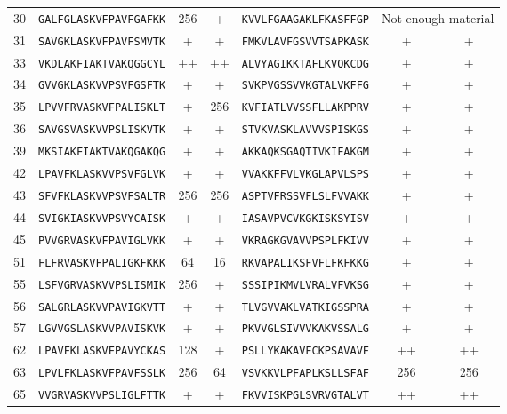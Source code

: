 \begin{table}[ptbh]
\begin{tabular}{llcclcc}
30  &  \texttt{GALFGLASKVFPAVFGAFKK}  &  256  &  +  & \texttt{KVVLFGAAGAKLFKASFFGP}  &  \multicolumn{2}{c}{Not enough material}   \\
\rowcolor[gray]{0.9}
31  &  \texttt{SAVGKLASKVFPAVFSMVTK}  &  +  &  +  & \texttt{FMKVLAVFGSVVTSAPKASK}  &  +  &  + \\
33  &  \texttt{VKDLAKFIAKTVAKQGGCYL}  &  ++  &  ++  & \texttt{ALVYAGIKKTAFLKVQKCDG}  &  +  &  + \\
\rowcolor[gray]{0.9}
34  &  \texttt{GVVGKLASKVVPSVFGSFTK}  &  +  &  +  & \texttt{SVKPVGSSVVKGTALVKFFG}  &  +  &  + \\
35  &  \texttt{LPVVFRVASKVFPALISKLT}  &  +  &  256  & \texttt{KVFIATLVVSSFLLAKPPRV}  &  +  &  + \\
\rowcolor[gray]{0.9}
36  &  \texttt{SAVGSVASKVVPSLISKVTK}  &  +  &  +  & \texttt{STVKVASKLAVVVSPISKGS}  &  +  &  + \\
39  &  \texttt{MKSIAKFIAKTVAKQGAKQG}  &  +  &  +  & \texttt{AKKAQKSGAQTIVKIFAKGM}  &  +  &  + \\
\rowcolor[gray]{0.9}
42  &  \texttt{LPAVFKLASKVVPSVFGLVK}  &  +  &  +  & \texttt{VVAKKFFVLVKGLAPVLSPS}  &  +  &  + \\
43  &  \texttt{SFVFKLASKVVPSVFSALTR}  &  256  &  256  & \texttt{ASPTVFRSSVFLSLFVVAKK}  &  +  &  + \\
\rowcolor[gray]{0.9}
44  &  \texttt{SVIGKIASKVVPSVYCAISK}  &  +  &  +  & \texttt{IASAVPVCVKGKISKSYISV}  &  +  &  + \\
45  &  \texttt{PVVGRVASKVFPAVIGLVKK}  &  +  &  +  & \texttt{VKRAGKGVAVVPSPLFKIVV}  &  +  &  + \\
\rowcolor[gray]{0.9}
51  &  \texttt{FLFRVASKVFPALIGKFKKK}  &  64  &  16  & \texttt{RKVAPALIKSFVFLFKFKKG}  &  +  &  + \\
55  &  \texttt{LSFVGRVASKVVPSLISMIK}  &  256  &  +  & \texttt{SSSIPIKMVLVRALVFVKSG}  &  +  &  + \\
\rowcolor[gray]{0.9}
56  &  \texttt{SALGRLASKVVPAVIGKVTT}  &  +  &  +  & \texttt{TLVGVVAKLVATKIGSSPRA}  &  +  &  + \\
57  &  \texttt{LGVVGSLASKVVPAVISKVK}  &  +  &  +  & \texttt{PKVVGLSIVVVKAKVSSALG}  &  +  &  + \\
\rowcolor[gray]{0.9}
62  &  \texttt{LPAVFKLASKVFPAVYCKAS}  &  128  &  +  & \texttt{PSLLYKAKAVFCKPSAVAVF}  &  ++  &  ++ \\
63  &  \texttt{LPVLFKLASKVFPAVFSSLK}  &  256  &  64  & \texttt{VSVKKVLPFAPLKSLLSFAF}  &  256  &  256 \\
\rowcolor[gray]{0.9}
65  &  \texttt{VVGRVASKVVPSLIGLFTTK}  &  +  &  +  & \texttt{FKVVISKPGLSVRVGTALVT}  &  ++  &  ++ \\

\end{tabular}
\end{table}
